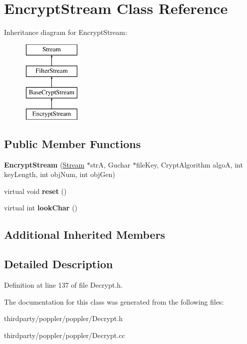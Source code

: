 \hypertarget{class_encrypt_stream}{}\section{Encrypt\+Stream Class Reference}
\label{class_encrypt_stream}
Inheritance diagram for Encrypt\+Stream\+:\begin{figure}[H]
\begin{center}
\leavevmode
\includegraphics[height=4.000000cm]{class_encrypt_stream}
\end{center}
\end{figure}
\subsection*{Public Member Functions}
\begin{DoxyCompactItemize}
\item 
\mbox{\label{class_encrypt_stream_a395a0922741517ff62c33f9c2cefe482}} 
{\bfseries Encrypt\+Stream} (\hyperlink{class_stream}{Stream} $\ast$strA, Guchar $\ast$file\+Key, Crypt\+Algorithm algoA, int key\+Length, int obj\+Num, int obj\+Gen)
\item 
\mbox{\label{class_encrypt_stream_acdcb5fc6d8fc01c3d62c39893d4915fa}} 
virtual void {\bfseries reset} ()
\item 
\mbox{\label{class_encrypt_stream_a7a1fe445787a64c0fbf0fdf90109abae}} 
virtual int {\bfseries look\+Char} ()
\end{DoxyCompactItemize}
\subsection*{Additional Inherited Members}


\subsection{Detailed Description}


Definition at line 137 of file Decrypt.\+h.



The documentation for this class was generated from the following files\+:\begin{DoxyCompactItemize}
\item 
thirdparty/poppler/poppler/Decrypt.\+h\item 
thirdparty/poppler/poppler/Decrypt.\+cc\end{DoxyCompactItemize}

